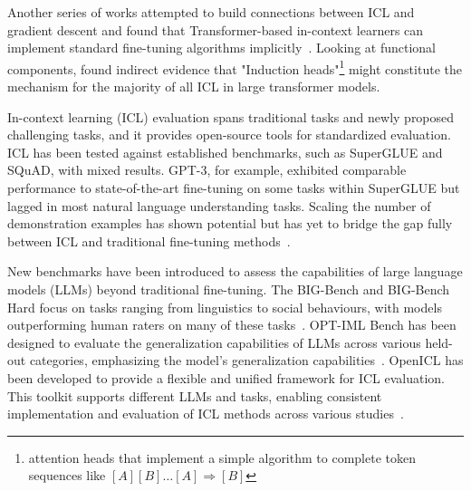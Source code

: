 Another series of works attempted to build connections between ICL and gradient descent and found that Transformer-based in-context learners can implement standard fine-tuning algorithms implicitly~\cite{akyurek2022what, vonoswald2023transformers, li2023transformers}.
Looking at functional components, \textcite{olsson2022incontext} found indirect evidence that "Induction heads"\footnote{attention heads that implement a simple algorithm to complete token sequences like $[A][B] \dots [A] \Rightarrow [B]$} might constitute the mechanism for the majority of all ICL in large transformer models.

In-context learning (ICL) evaluation spans traditional tasks and newly proposed challenging tasks, and it provides open-source tools for standardized evaluation.
ICL has been tested against established benchmarks, such as SuperGLUE and SQuAD, with mixed results.
GPT-3, for example, exhibited comparable performance to state-of-the-art fine-tuning on some tasks within SuperGLUE but lagged in most natural language understanding tasks.
Scaling the number of demonstration examples has shown potential but has yet to bridge the gap fully between ICL and traditional fine-tuning methods~\cite{brown2020language, hao2022structured}.

New benchmarks have been introduced to assess the capabilities of large language models (LLMs) beyond traditional fine-tuning.
The BIG-Bench and BIG-Bench Hard focus on tasks ranging from linguistics to social behaviours, with models outperforming human raters on many of these tasks~\cite{srivastava2023imitation, suzgun2022challenging}.
OPT-IML Bench has been designed to evaluate the generalization capabilities of LLMs across various held-out categories, emphasizing the model's generalization capabilities~\cite{iyer2022opt}.
OpenICL has been developed to provide a flexible and unified framework for ICL evaluation.
This toolkit supports different LLMs and tasks, enabling consistent implementation and evaluation of ICL methods across various studies~\cite{wu2023openicl}.

